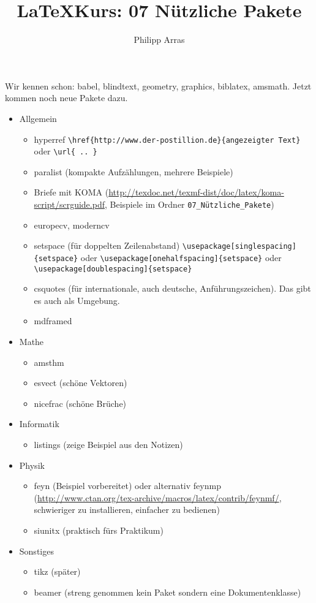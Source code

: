 \documentclass[11pt,a4paper]{scrartcl}
\author{Philipp Arras}
\title{\LaTeX Kurs: 07 Nützliche Pakete}
\begin{document}
\maketitle

Wir kennen schon: babel, blindtext, geometry, graphics, biblatex, amsmath. Jetzt kommen noch neue Pakete dazu.
\begin{itemize}
\item Allgemein
	\begin{itemize}
	\item hyperref \verb|\href{http://www.der-postillion.de}{angezeigter Text}| oder \verb|\url{ .. }|
	\item paralist (kompakte Aufzählungen, mehrere Beispiele)
	\item Briefe mit KOMA (\url{http://texdoc.net/texmf-dist/doc/latex/koma-script/scrguide.pdf}, Beispiele im Ordner \verb|07_Nützliche_Pakete|)
	\item europecv, moderncv
	\item setspace (für doppelten Zeilenabstand) \verb|\usepackage[singlespacing]{setspace}| oder \verb|\usepackage[onehalfspacing]{setspace}| oder \verb|\usepackage[doublespacing]{setspace}|
	\item csquotes (für internationale, auch deutsche, Anführungszeichen). Das gibt es auch als Umgebung.
	\item mdframed
	
	\end{itemize}
\item Mathe
	\begin{itemize}
	\item amsthm 
		
	\item esvect (schöne Vektoren)
	\item nicefrac (schöne Brüche)
	\end{itemize}
\item Informatik
	\begin{itemize}
	\item listings (zeige Beispiel aus den Notizen)
	\end{itemize}
\item Physik
	\begin{itemize}
	\item feyn (Beispiel vorbereitet) oder alternativ feynmp (\url{http://www.ctan.org/tex-archive/macros/latex/contrib/feynmf/}, schwieriger zu installieren, einfacher zu bedienen)
	\item siunitx (praktisch fürs Praktikum)
	\end{itemize}
\item Sonstiges
	\begin{itemize}
	\item tikz (später)
	\item beamer (streng genommen kein Paket sondern eine Dokumentenklasse)
	\end{itemize}
\end{itemize}
\end{document}
